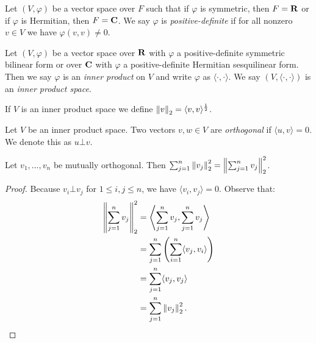     \begin{definition}
        Let $(V,\varphi)$ be a vector space over $F$ such that if $\varphi$ is symmetric, then $F = \mathbf{R}$ or if $\varphi$ is Hermitian, then $F = \mathbf{C}$. We say $\varphi$ is \textit{positive-definite} if for all nonzero $v \in V$ we have $\varphi(v,v) \neq 0$.
    \end{definition}

    \begin{definition}


        Let $(V,\varphi)$ be a vector space over $\mathbf{R}$ with $\varphi$ a positive-definite symmetric bilinear form or over $\mathbf{C}$ with $\varphi$ a positive-definite Hermitian sesquilinear form. Then we say $\varphi$ is an \textit{inner product} on $V$ and write $\varphi$ as $\langle \cdot,\cdot \rangle$. We say $(V,\langle \cdot,\cdot \rangle)$ is an \textit{inner product space}.
    \end{definition}

    \begin{center}
    \end{center}
    
    \begin{definition}
        If $V$ is an inner product space we define $\left\lVert v \right\rVert_2 = \langle v,v \rangle^\frac{1}{2}$.
    \end{definition}

    \begin{definition}
        Let $V$ be an inner product space. Two vectors $v,w \in V$ are \textit{orthogonal} if $\langle u,v \rangle = 0$. We denote this as $u \bot v$.
    \end{definition}

    \begin{theorem}
        Let $v_1,...,v_n$ be mutually orthogonal. Then $\sum_{j = 1}^n \left\lVert v_j \right\rVert_2^2 = \left\lVert \sum_{j = 1}^n v_j \right\rVert_2^2$.
    \end{theorem}
        \begin{proof}
            Because $v_i \bot v_j$ for $1 \leq i,j \leq n$, we have $\langle v_i,v_j \rangle = 0$. Observe that:
                \begin{equation*}
                \begin{split}
                    \left\lVert \sum_{j = 1}^n v_j \right\rVert_2^2
                    & = \Biggl< \sum_{j = 1}^n v_j , \sum_{j = 1}^n v_j \Biggr> \\
                    & = \sum_{j = 1}^n \left( \sum_{i = 1}^n \langle v_j,v_i \rangle \right) \\
                    & = \sum_{j =1}^n \langle v_j,v_j \rangle \\
                    & = \sum_{j = 1}^n \left\lVert v_j \right\rVert_2^2.
                \end{split}
                \end{equation*}
        \end{proof}
    
